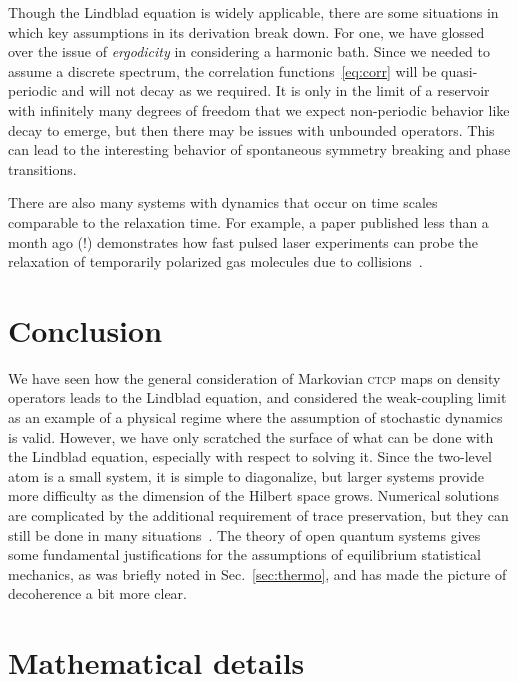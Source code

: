 \documentclass[../thesis.tex]{subfiles}
\begin{document}
Though the Lindblad equation is widely applicable, there are some situations in
which key assumptions in its derivation break down. For one, we have glossed
over the issue of \emph{ergodicity} in considering a harmonic bath. Since we
needed to assume a discrete spectrum, the correlation functions~\eqref{eq:corr}
will be quasi-periodic and will not decay as we required. It is only in the
limit of a reservoir with infinitely many degrees of freedom that we expect
non-periodic behavior like decay to emerge, but then there may be issues with
unbounded operators. This can lead to the interesting behavior of spontaneous
symmetry breaking and phase transitions.

There are also many systems with dynamics that occur on time scales comparable
to the relaxation time. For example, a paper published less than a month ago (!)
demonstrates how fast pulsed laser experiments can probe the relaxation of
temporarily polarized gas molecules due to
collisions~\cite{collisions1,collisions2}.

\section{Conclusion}

We have seen how the general consideration of Markovian \textsc{ctcp} maps on
density operators leads to the Lindblad equation, and considered the
weak-coupling limit as an example of a physical regime where the assumption of
stochastic dynamics is valid. However, we have only scratched the surface of
what can be done with the Lindblad equation, especially with respect to solving
it. Since the two-level atom is a small system, it is simple to diagonalize, but
larger systems provide more difficulty as the dimension of the Hilbert space
grows. Numerical solutions are complicated by the additional requirement of
trace preservation, but they can still be done in many
situations~\cite{intro,collisions1}. The theory of open quantum systems gives
some fundamental justifications for the assumptions of equilibrium statistical
mechanics, as was briefly noted in Sec.~\ref{sec:thermo}, and has made the
picture of decoherence a bit more clear.

\section{Mathematical details\label{sec:math}}
\end{document}
